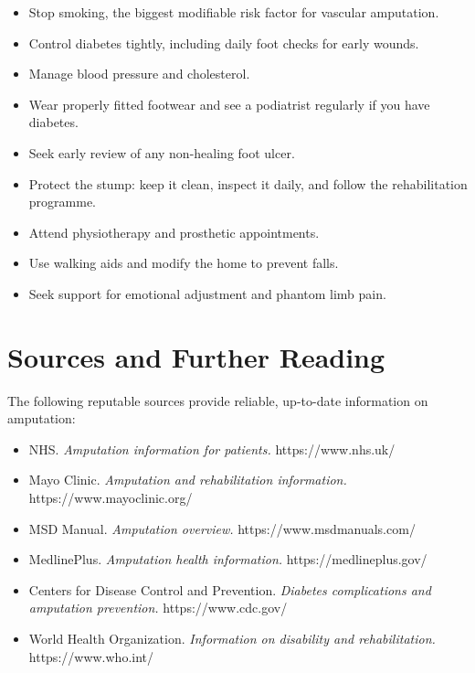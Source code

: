 \begin{itemize}
    \item Stop smoking, the biggest modifiable risk factor for vascular amputation.
    \item Control diabetes tightly, including daily foot checks for early wounds.
    \item Manage blood pressure and cholesterol.
    \item Wear properly fitted footwear and see a podiatrist regularly if you have diabetes.
    \item Seek early review of any non-healing foot ulcer.
    \item Protect the stump: keep it clean, inspect it daily, and follow the rehabilitation programme.
    \item Attend physiotherapy and prosthetic appointments.
    \item Use walking aids and modify the home to prevent falls.
    \item Seek support for emotional adjustment and phantom limb pain.
\end{itemize}

\section*{Sources and Further Reading}
The following reputable sources provide reliable, up-to-date information on amputation:

\begin{itemize}
    \item NHS. \textit{Amputation information for patients.} https://www.nhs.uk/
    \item Mayo Clinic. \textit{Amputation and rehabilitation information.} https://www.mayoclinic.org/
    \item MSD Manual. \textit{Amputation overview.} https://www.msdmanuals.com/
    \item MedlinePlus. \textit{Amputation health information.} https://medlineplus.gov/
    \item Centers for Disease Control and Prevention. \textit{Diabetes complications and amputation prevention.} https://www.cdc.gov/
    \item World Health Organization. \textit{Information on disability and rehabilitation.} https://www.who.int/
\end{itemize}
